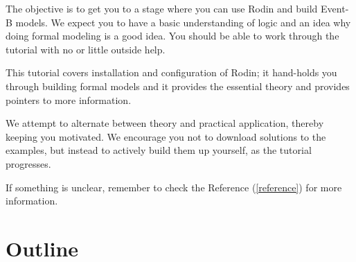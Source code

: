 
The objective is to get you to a stage where you can use Rodin and build Event-B models.  We expect you to have a basic understanding of logic and an idea why doing formal modeling is a good idea.  You should be able to work through the tutorial with no or little outside help.

This tutorial covers installation and configuration of Rodin; it hand-holds you through building formal models and it provides the essential theory and provides pointers to more information.

We attempt to alternate between theory and practical application, thereby keeping you motivated.  We encourage you not to download solutions to the examples, but instead to actively build them up yourself, as the tutorial progresses.

If something is unclear, remember to check the Reference (\ref{reference}) for more information.


\section{Outline}

